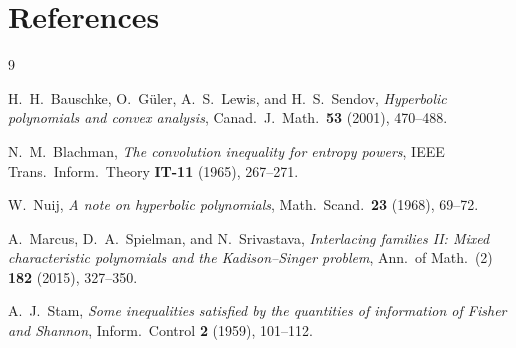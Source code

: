\documentclass[11pt,a4paper]{amsart}
\theoremstyle{plain}
\theoremstyle{definition}
\theoremstyle{remark}
\begin{document}
\section*{References}

\begin{thebibliography}{9}

H.~H.~Bauschke, O.~G\"uler, A.~S.~Lewis,
and H.~S.~Sendov,
\emph{Hyperbolic polynomials and convex analysis},
Canad.\ J.\ Math.\ \textbf{53} (2001), 470--488.

N.~M.~Blachman,
\emph{The convolution inequality for entropy powers},
IEEE Trans.\ Inform.\ Theory \textbf{IT-11} (1965),
267--271.

W.~Nuij,
\emph{A note on hyperbolic polynomials},
Math.\ Scand.\ \textbf{23} (1968), 69--72.

A.~Marcus, D.~A.~Spielman, and N.~Srivastava,
\emph{Interlacing families {II}: Mixed characteristic
polynomials and the {K}adison--{S}inger problem},
Ann.\ of Math.\ (2) \textbf{182} (2015), 327--350.

A.~J.~Stam,
\emph{Some inequalities satisfied by the quantities of
information of {F}isher and {S}hannon},
Inform.\ Control \textbf{2} (1959), 101--112.

\end{thebibliography}
\end{document}
